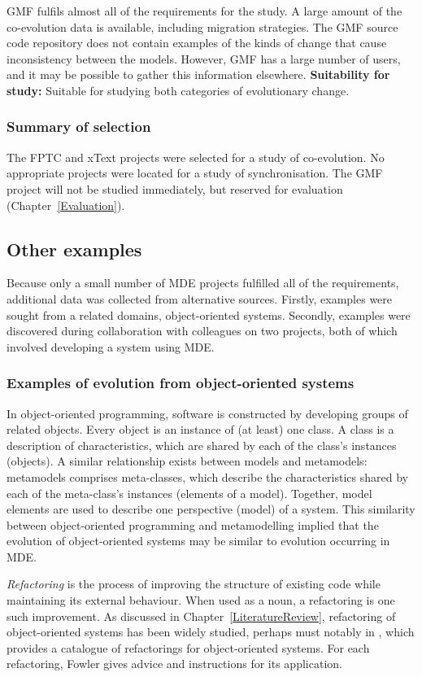 GMF fulfils almost all of the requirements for the study. A large amount of the co-evolution data is available, including migration strategies. The GMF source code repository does not contain examples of the kinds of change that cause inconsistency between the models. However, GMF has a large number of users, and it may be possible to gather this information elsewhere. \textbf{Suitability for study:} Suitable for studying both categories of evolutionary change.

\subsubsection{Summary of selection}
The FPTC and xText projects were selected for a study of co-evolution. No appropriate projects were located for a study of synchronisation. The GMF project will not be studied immediately, but reserved for evaluation (Chapter~\ref{Evaluation}).


\subsection{Other examples}
Because only a small number of MDE projects fulfilled all of the requirements, additional data was collected from alternative sources. Firstly, examples were sought from a related domains, object-oriented systems. Secondly, examples were discovered during collaboration with colleagues on two projects, both of which involved developing a system using MDE.

\subsubsection{Examples of evolution from object-oriented systems}
In object-oriented programming, software is constructed by developing groups of related objects. Every object is an instance of (at least) one class. A class is a description of characteristics, which are shared by each of the class's instances (objects). A similar relationship exists between models and metamodels: metamodels comprises meta-classes, which describe the characteristics shared by each of the meta-class's instances (elements of a model). Together, model elements are used to describe one perspective (model) of a system. This similarity between object-oriented programming and metamodelling implied that the evolution of object-oriented systems may be similar to evolution occurring in MDE. 

\emph{Refactoring} is the process of improving the structure of existing code while maintaining its external behaviour. When used as a noun, a refactoring is one such improvement. As discussed in Chapter~\ref{LiteratureReview}, refactoring of object-oriented systems has been widely studied, perhaps must notably in \cite{fowler99refactoring}, which provides a catalogue of refactorings for object-oriented systems. For each refactoring, Fowler gives advice and instructions for its application.

